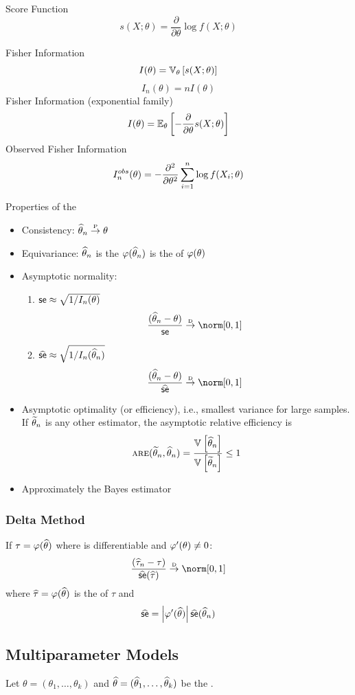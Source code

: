\documentclass[landscape]{article}
\begin{document}
\begin{multicols*}{2}
Score Function
$$s(X;\theta) = \frac{\partial}{\partial\theta}\log f(X;\theta)$$

Fisher Information
$$I(\theta) = \V[\theta]{s(X;\theta)}$$
$$I_n(\theta) = nI(\theta)$$
Fisher Information (exponential family)
$$I(\theta) = \E[\theta]{-\frac{\partial}{\partial\theta} s(X;\theta)}$$
Observed Fisher Information
$$I_n^{obs}(\theta) 
  = -\frac{\partial^2}{\partial\theta^2} \sumin\log f(X_i;\theta)$$

Properties of the \mle
\begin{itemize}
  \item Consistency: $\that_n \pconv \theta$
  \item Equivariance: 
    $\that_n$ is the \mle \imp $\transform(\that_n)$ is
    the \mle of $\transform(\theta)$
  \item Asymptotic normality:
    \begin{enumerate}
      \item $\se \approx \sqrt{1/I_n(\theta)}$
        $$\frac{(\that_n - \theta)}{\se} \dconv \norm[0,1]$$
      \item $\sehat \approx \sqrt{1/I_n(\that_n)}$
        $$\frac{(\that_n - \theta)}{\sehat} \dconv \norm[0,1]$$
    \end{enumerate}
  \item Asymptotic optimality (or efficiency), i.e., smallest variance for
    large samples.  If $\ttil_n$ is any other estimator, the asymptotic
    relative efficiency is
    $$\are(\ttil_n, \that_n) 
      = \frac{\V{\that_n}}{\V{\ttil_n}}
      \le 1$$
  \item Approximately the Bayes estimator
\end{itemize}

\subsubsection{Delta Method}
If $\tau=\transform(\that)$ where \transform is differentiable and
$\transform^\prime(\theta) \neq 0$:
$$\frac{(\widehat{\tau}_n-\tau)}{\sehat(\widehat{\tau})} \dconv \norm[0,1]$$
where $\widehat{\tau} = \transform(\that)$ is the \mle of $\tau$ and
$$\sehat =
\left|\transform^\prime(\that)\right|\sehat(\that_n)$$

\subsection{Multiparameter Models}

Let $\theta=(\theta_1,\dots,\theta_k)$ and 
$\that= (\that_1,\dots,\that_k)$ be the \mle.


\end{multicols*}
\end{document}
